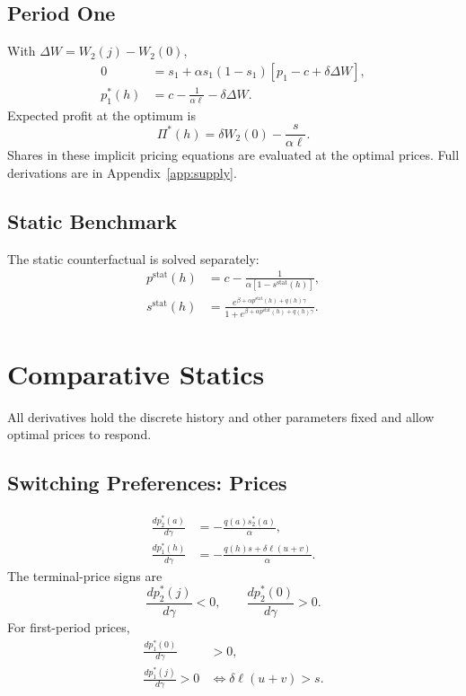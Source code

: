 \documentclass[12pt]{article}
\theoremstyle{definition}
\theoremstyle{remark}
\begin{document}
\subsection{Period One}
\label{subsec:price-derivation}
With $\Delta W=W_2(j)-W_2(0)$,
\begin{align}
 0&=s_1+\alpha s_1(1-s_1)[p_1-c+\delta\Delta W],\\
 p_1^*(h)&=c-\frac{1}{\alpha\ell}-\delta\Delta W.
 \label{eq:supply-first}
\end{align}
Expected profit at the optimum is
\begin{equation}
 \Pi^*(h)=\delta W_2(0)-\frac{s}{\alpha\ell}.
\end{equation}
Shares in these implicit pricing equations are evaluated at the optimal prices.
Full derivations are in Appendix~\ref{app:supply}.

\subsection{Static Benchmark}
The static counterfactual is solved separately:
\begin{align}
 p^{\mathrm{stat}}(h)&=c-\frac{1}{\alpha[1-s^{\mathrm{stat}}(h)]},\\
 s^{\mathrm{stat}}(h)&=\frac{e^{\beta+\alpha p^{\mathrm{stat}}(h)+q(h)\gamma}}
 {1+e^{\beta+\alpha p^{\mathrm{stat}}(h)+q(h)\gamma}}.
\end{align}

\section{Comparative Statics}
\label{sec:comparative-statics}
All derivatives hold the discrete history and other parameters fixed and allow
optimal prices to respond.

\subsection{Switching Preferences: Prices}
\begin{align}
 \frac{dp_2^*(a)}{d\gamma}&=-\frac{q(a)s_2^*(a)}{\alpha},\\
 \frac{dp_1^*(h)}{d\gamma}&=-\frac{q(h)s+\delta\ell(u+v)}{\alpha}.
 \label{eq:supply-gamma-prices}
\end{align}
The terminal-price signs are
\begin{equation}
 \frac{dp_2^*(j)}{d\gamma}<0,\qquad
 \frac{dp_2^*(0)}{d\gamma}>0.
\end{equation}
For first-period prices,
\begin{align}
 \frac{dp_1^*(0)}{d\gamma}&>0,\\
 \frac{dp_1^*(j)}{d\gamma}>0
 &\iff\delta\ell(u+v)>s.
\end{align}
\end{document}
